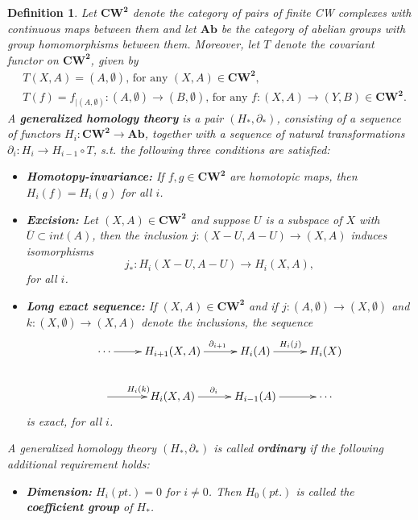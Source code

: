 \documentclass{scrreprt}
\newtheorem{definition}[prop]{Definition}
\begin{document}
\begin{definition}
Let $\boldsymbol{CW^2}$ denote the category of pairs of finite CW complexes with continuous maps between them and let $\boldsymbol{Ab}$ be the category of abelian groups with group homomorphisms between them. Moreover, let $T$ denote the covariant functor on $\boldsymbol{CW^2}$, given by
\begin{align*}
&T(X,A) = (A, \emptyset) \text{, for any } (X,A) \in \boldsymbol{CW^2},  \\
&T(f) = f_{|(A, \emptyset)} : (A, \emptyset) \to (B, \emptyset) \text{, for any } f: (X,A) \to (Y,B) \in \boldsymbol{CW^2}.
\end{align*}
A \textbf{generalized homology theory} is a pair $(H_*, \partial_*)$, consisting of a sequence of functors $H_i : \boldsymbol{CW^2} \to \boldsymbol{Ab}$, together with a sequence of natural transformations \\ $\partial_i : H_i \to H_{i-1} \circ T$, s.t. the following three conditions are satisfied: \begin{itemize}
\item[1.] \textbf{Homotopy-invariance:} If $f,g \in \boldsymbol{CW^2}$ are homotopic maps, then $H_i(f)=H_i(g)$ for all $i$.
\item[2.] \textbf{Excision:} Let $(X,A) \in \boldsymbol{CW^2}$ and suppose $U$ is a subspace of $X$ with $\overline{U} \subset int(A)$, then the inclusion $j: (X-U,A-U) \to (X,A)$ induces isomorphisms 
\begin{equation*}
j_* : H_i(X-U,A-U) \to H_i(X,A),
\end{equation*}
for all $i$.
\item[3.] \textbf{Long exact sequence:} If $(X,A) \in \boldsymbol{CW^2}$ and if $j: (A, \emptyset) \to (X, \emptyset)$ and $k: (X, \emptyset) \to (X,A)$ denote the inclusions, the sequence
\begin{equation*}
\begin{xy}
\xymatrix{ 
\cdots \ar[r]^{}     &   H_{i+1}(X,A) \ar[r]^{\ \ \partial_{i+1}}    &   H_i(A) \ar[r]^{H_i(j)}   &  H_i(X) \\
  \ar[r]^{H_i(k)}   &   H_i(X,A)  \ar[r]^{\partial_i}   &   H_{i-1}(A) \ar[r]^{}   &   \cdots
}
\end{xy}
\end{equation*}
is exact, for all $i$.
\end{itemize}
A generalized homology theory $(H_*, \partial_*)$ is called \textbf{ordinary} if the following additional requirement holds:
\begin{itemize}
\item[4.] \textbf{Dimension:} $H_i(pt.)=0$ for $i \neq 0$. Then $H_0(pt.)$ is called the \textbf{coefficient group} of $H_*$.
\end{itemize}
\end{definition}
\end{document}
